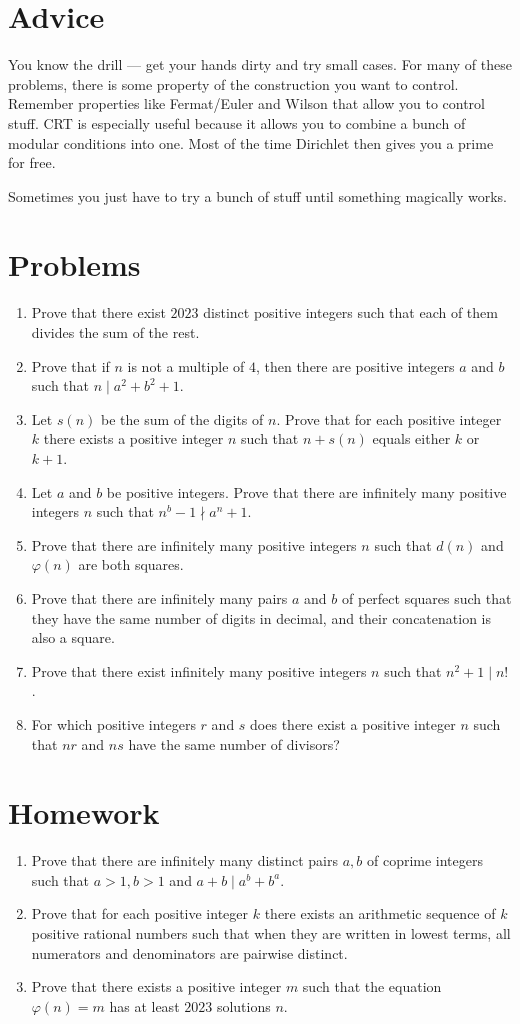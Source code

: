 \documentclass{article}
\begin{document}
\section{Advice}
You know the drill --- get your hands dirty and try small cases. For many of
these problems, there is some property of the construction you want to control.
Remember properties like Fermat/Euler and Wilson that allow you to control stuff.
CRT is especially useful because it allows
you to combine a bunch of modular conditions into one. Most of the time
Dirichlet then gives you a prime for free.

Sometimes you just have to try a bunch of stuff until something magically works.
\section{Problems}
\begin{enumerate}
  \item Prove that there exist $2023$ distinct positive integers such that each of them
    divides the sum of the rest.
  \item Prove that if $n$ is not a multiple of $4$, then there are positive
    integers $a$ and $b$ such that $n\mid a^2+b^2+1$.
  \item Let $s(n)$ be the sum of the digits of $n$. Prove that for each positive
    integer $k$ there exists a positive integer $n$ such that $n+s(n)$ equals
    either $k$ or $k+1$.
  \item Let $a$ and $b$ be positive integers. Prove that there are infinitely
    many positive integers $n$ such that $n^b-1\nmid a^n+1$.
  \item Prove that there are infinitely many positive integers $n$ such that
    $d(n)$ and $\varphi(n)$ are both squares.
  \item Prove that there are infinitely many pairs $a$ and $b$ of perfect
    squares such that they have the same number of digits in decimal, and their
    concatenation is also a square.
  \item Prove that there exist infinitely many positive integers $n$ such that
    $n^2+1\mid n!$.
  \item For which positive integers $r$ and $s$ does there exist a positive
    integer $n$ such that $nr$ and $ns$ have the same number of divisors?
\end{enumerate}
\newpage
\section{Homework}
\begin{enumerate}
  \item Prove that there are infinitely many distinct pairs $a,b$ of coprime
    integers such that $a>1,b>1$ and $a+b\mid a^b+b^a$.
  \item Prove that for each positive integer $k$ there exists an arithmetic
    sequence of $k$ positive rational numbers such that when they are written in lowest
    terms, all numerators and denominators are pairwise distinct.
  \item Prove that there exists a positive integer $m$ such that the equation
    $\varphi(n)=m$ has at least $2023$ solutions $n$.
\end{enumerate}
\end{document}
